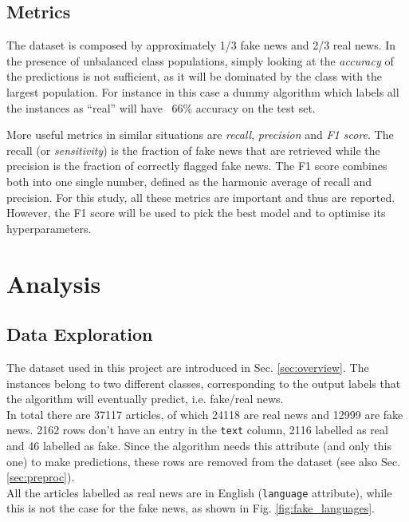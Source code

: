 \documentclass[a4paper,12pt]{article} %
\begin{document}
\subsection{Metrics}
The dataset is composed by approximately 1/3 fake news and 2/3 real news.
In the presence of unbalanced class populations, simply looking at
the \textit{accuracy} of the predictions is not sufficient, as it will be
dominated by the class with the largest population.
For instance in this case a dummy algorithm which labels all the
instances as ``real'' will have ~66\% accuracy on the test set.

More useful metrics in similar situations are \textit{recall}, \textit{precision} and \textit{F1 score}.
The recall (or \textit{sensitivity}) \cite{wiki_recall_precision} is the fraction
of fake news that are retrieved while the precision is the fraction of correctly flagged fake news.
The F1 score \cite{wiki_f1score} combines both into one single number, defined as the harmonic average
of recall and precision.
For this study, all these metrics are important and thus are reported.
However, the F1 score will be used to pick the best model and to optimise its hyperparameters.


\section{Analysis}

\subsection{Data Exploration}
\label{sec:explore}
The dataset used in this project are introduced in Sec. \ref{sec:overview}.
The instances belong to two different classes, corresponding to the output labels
that the algorithm will eventually predict, i.e. fake/real news. \\
In total there are 37117 articles, of which 24118 are real news and 12999 are fake news.
2162 rows don't have an entry in the \texttt{text} column, 2116 labelled as real and
46 labelled as fake.
Since the algorithm needs this attribute (and only this one) to make predictions,
these rows are removed from the dataset (see also Sec. \ref{sec:preproc}). \\
All the articles labelled as real news are in English (\texttt{language} attribute),
while this is not the case for the fake news, as shown in Fig. \ref{fig:fake_languages}.
\end{document}
